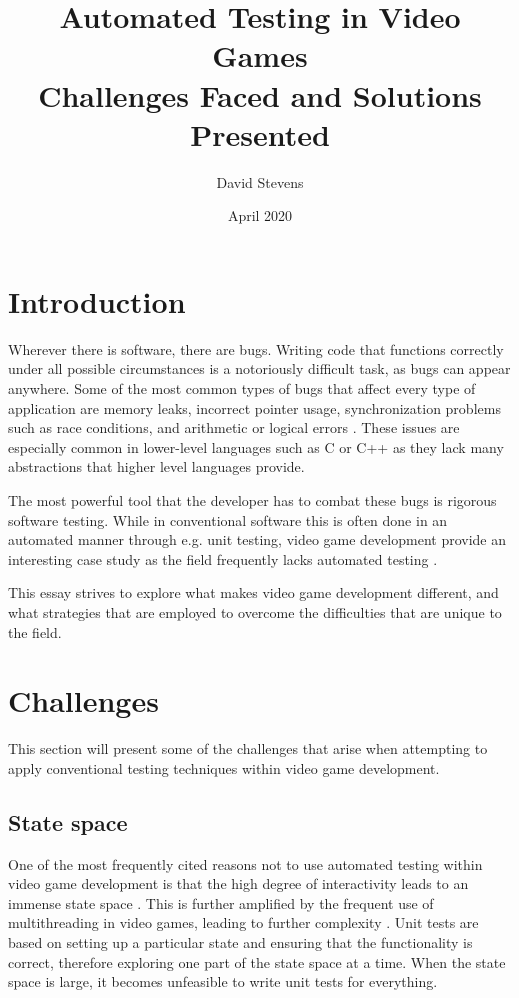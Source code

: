 \documentclass{article}
\title{Automated Testing in Video Games\\\large Challenges Faced and Solutions Presented}
\author{David Stevens}
\date{April 2020}
\begin{document}
    \maketitle

    \section{Introduction}
    Wherever there is software, there are bugs. Writing code that functions correctly under all possible circumstances is a notoriously difficult task, as bugs can appear anywhere. Some of the most common types of bugs that affect every type of application are memory leaks, incorrect pointer usage, synchronization problems such as race conditions, and arithmetic or logical errors \parencite{vipindeep2005list}. These issues are especially common in lower-level languages such as C or C++ \parencite{ahsan2009there} as they lack many abstractions that higher level languages provide. 
    
    The most powerful tool that the developer has to combat these bugs is rigorous software testing. While in conventional software this is often done in an automated manner through e.g. unit testing, video game development provide an interesting case study as the field frequently lacks automated testing \parencite{murphy2014cowboys}. 

    This essay strives to explore what makes video game development different, and what strategies that are employed to overcome the difficulties that are unique to the field.

    \section{Challenges}
    This section will present some of the challenges that arise when attempting to apply conventional testing techniques within video game development. 

    \subsection{State space}
    One of the most frequently cited reasons not to use automated testing within video game development is that the high degree of interactivity leads to an immense state space \parencite{murphy2014cowboys,parsons2015tdd,loubos2018automated}. This is further amplified by the frequent use of multithreading in video games, leading to further complexity \parencite{carmack2012functional,gilbert2018unit}. Unit tests are based on setting up a particular state and ensuring that the functionality is correct, therefore exploring one part of the state space at a time. When the state space is large, it becomes unfeasible to write unit tests for everything.
\end{document}
